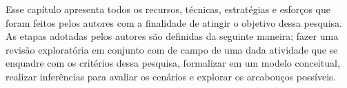 Esse capítulo apresenta todos os recursos, técnicas, estratégias e esforços que foram feitos pelos autores com a finalidade de atingir o objetivo dessa pesquisa. As etapas adotadas pelos autores são definidas da seguinte maneira; fazer uma revisão exploratória em conjunto com de campo de uma dada atividade que se enquadre com os critérios dessa pesquisa, formalizar em um modelo conceitual, realizar inferências para avaliar os cenários e explorar os arcabouços possíveis.
